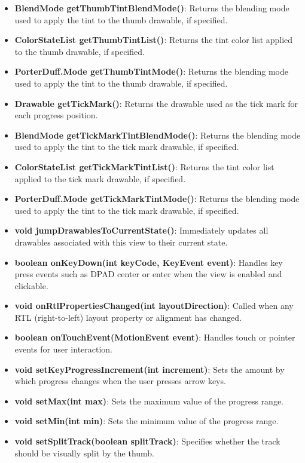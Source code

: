 \documentclass{report}
\begin{document}
\begin{itemize}
\begin{itemize}
                \item \textbf{BlendMode getThumbTintBlendMode()}: Returns the blending mode used to apply the tint to the thumb drawable, if specified.
                \item \textbf{ColorStateList getThumbTintList()}: Returns the tint color list applied to the thumb drawable, if specified.
                \item \textbf{PorterDuff.Mode getThumbTintMode()}: Returns the blending mode used to apply the tint to the thumb drawable, if specified.
                \item \textbf{Drawable getTickMark()}: Returns the drawable used as the tick mark for each progress position.
                \item \textbf{BlendMode getTickMarkTintBlendMode()}: Returns the blending mode used to apply the tint to the tick mark drawable, if specified.
                \item \textbf{ColorStateList getTickMarkTintList()}: Returns the tint color list applied to the tick mark drawable, if specified.
                \item \textbf{PorterDuff.Mode getTickMarkTintMode()}: Returns the blending mode used to apply the tint to the tick mark drawable, if specified.
                \item \textbf{void jumpDrawablesToCurrentState()}: Immediately updates all drawables associated with this view to their current state.
                \item \textbf{boolean onKeyDown(int keyCode, KeyEvent event)}: Handles key press events such as DPAD center or enter when the view is enabled and clickable.
                \item \textbf{void onRtlPropertiesChanged(int layoutDirection)}: Called when any RTL (right-to-left) layout property or alignment has changed.
                \item \textbf{boolean onTouchEvent(MotionEvent event)}: Handles touch or pointer events for user interaction.
                \item \textbf{void setKeyProgressIncrement(int increment)}: Sets the amount by which progress changes when the user presses arrow keys.
                \item \textbf{void setMax(int max)}: Sets the maximum value of the progress range.
                \item \textbf{void setMin(int min)}: Sets the minimum value of the progress range.
                \item \textbf{void setSplitTrack(boolean splitTrack)}: Specifies whether the track should be visually split by the thumb.

\end{itemize}
\end{itemize}
\end{document}
